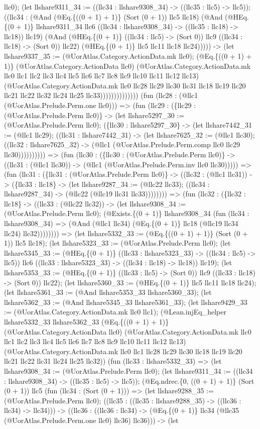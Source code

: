 \documentclass[11pt]{article}
\begin{document}
llc0); (let llshare9311\_34 := ((llc34 : llshare9308\_34) -> ((llc35 : llc5) -> llc5)); ((llc34 : (@And (@Eq.\{((0 + 1) + 1)\} (Sort (0 + 1)) llc5 llc18) (@And (@HEq.\{(0 + 1)\} llshare9311\_34 llc6 ((llc34 : llshare9308\_34) -> ((llc35 : llc18) -> llc18)) llc19) (@And (@HEq.\{(0 + 1)\} ((llc34 : llc5) -> (Sort 0)) llc9 ((llc34 : llc18) -> (Sort 0)) llc22) (@HEq.\{(0 + 1)\} llc5 llc11 llc18 llc24))))) -> (let llshare9337\_35 := (@UorAtlas.Category.ActionData.mk llc0); (@Eq.\{((0 + 1) + 1)\} (@UorAtlas.Category.ActionData llc0) (@UorAtlas.Category.ActionData.mk llc0 llc1 llc2 llc3 llc4 llc5 llc6 llc7 llc8 llc9 llc10 llc11 llc12 llc13) (@UorAtlas.Category.ActionData.mk llc0 llc28 llc29 llc30 llc31 llc18 llc19 llc20 llc21 llc22 llc32 llc24 llc25 llc33)))))))))))))) (fun (llc28 : (@llc1 (@UorAtlas.Prelude.Perm.one llc0))) => (fun (llc29 : (\{llc29 : (@UorAtlas.Prelude.Perm llc0)\} -> (let llshare5297\_30 := (@UorAtlas.Prelude.Perm llc0); (\{llc30 : llshare5297\_30\} -> (let llshare7442\_31 := (@llc1 llc29); ((llc31 : llshare7442\_31) -> (let llshare7625\_32 := (@llc1 llc30); ((llc32 : llshare7625\_32) -> (@llc1 (@UorAtlas.Prelude.Perm.comp llc0 llc29 llc30)))))))))) => (fun (llc30 : (\{llc30 : (@UorAtlas.Prelude.Perm llc0)\} -> ((llc31 : (@llc1 llc30)) -> (@llc1 (@UorAtlas.Prelude.Perm.inv llc0 llc30))))) => (fun (llc31 : (\{llc31 : (@UorAtlas.Prelude.Perm llc0)\} -> ((llc32 : (@llc1 llc31)) -> (\{llc33 : llc18\} -> (let llshare9287\_34 := (@llc22 llc33); ((llc34 : llshare9287\_34) -> (@llc22 (@llc19 llc31 llc33)))))))) => (fun (llc32 : (\{llc32 : llc18\} -> ((llc33 : (@llc22 llc32)) -> (let llshare9308\_34 := (@UorAtlas.Prelude.Perm llc0); (@Exists.\{(0 + 1)\} llshare9308\_34 (fun (llc34 : llshare9308\_34) => (@And (@llc1 llc34) (@Eq.\{(0 + 1)\} llc18 (@llc19 llc34 llc24) llc32)))))))) => (let llshare5332\_33 := (@Eq.\{((0 + 1) + 1)\} (Sort (0 + 1)) llc5 llc18); (let llshare5323\_33 := (@UorAtlas.Prelude.Perm llc0); (let llshare5345\_33 := (@HEq.\{(0 + 1)\} ((llc33 : llshare5323\_33) -> ((llc34 : llc5) -> llc5)) llc6 ((llc33 : llshare5323\_33) -> ((llc34 : llc18) -> llc18)) llc19); (let llshare5353\_33 := (@HEq.\{(0 + 1)\} ((llc33 : llc5) -> (Sort 0)) llc9 ((llc33 : llc18) -> (Sort 0)) llc22); (let llshare5360\_33 := (@HEq.\{(0 + 1)\} llc5 llc11 llc18 llc24); (let llshare5361\_33 := (@And llshare5353\_33 llshare5360\_33); (let llshare5362\_33 := (@And llshare5345\_33 llshare5361\_33); (let llshare9429\_33 := (@UorAtlas.Category.ActionData.mk llc0 llc1); (@Lean.injEq\_helper llshare5332\_33 llshare5362\_33 (@Eq.\{((0 + 1) + 1)\} (@UorAtlas.Category.ActionData llc0) (@UorAtlas.Category.ActionData.mk llc0 llc1 llc2 llc3 llc4 llc5 llc6 llc7 llc8 llc9 llc10 llc11 llc12 llc13) (@UorAtlas.Category.ActionData.mk llc0 llc1 llc28 llc29 llc30 llc18 llc19 llc20 llc21 llc22 llc31 llc24 llc25 llc32)) (fun (llc33 : llshare5332\_33) => (let llshare9308\_34 := (@UorAtlas.Prelude.Perm llc0); (let llshare9311\_34 := ((llc34 : llshare9308\_34) -> ((llc35 : llc5) -> llc5)); (@Eq.ndrec.\{0, ((0 + 1) + 1)\} (Sort (0 + 1)) llc5 (fun (llc34 : (Sort (0 + 1))) => (let llshare9288\_35 := (@UorAtlas.Prelude.Perm llc0); ((llc35 : ((llc35 : llshare9288\_35) -> ((llc36 : llc34) -> llc34))) -> ((llc36 : ((llc36 : llc34) -> (@Eq.\{(0 + 1)\} llc34 (@llc35 (@UorAtlas.Prelude.Perm.one llc0) llc36) llc36))) -> (let 
\end{document}
